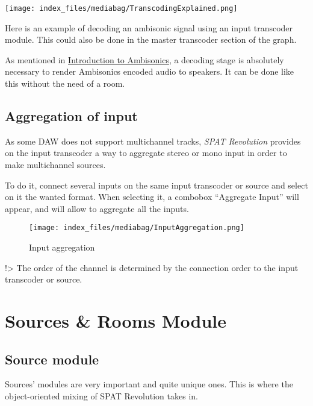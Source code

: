 \documentclass[
  letterpaper,
  DIV=11,
  numbers=noendperiod]{scrreport}
\begin{document}
\texttt{[image: index\_files/mediabag/TranscodingExplained.png]}

Here is an example of decoding an ambisonic signal using an input
transcoder module. This could also be done in the master transcoder
section of the graph.

As mentioned in
\href{Spatialisation_Technology_Scene_based_streams.md?id=introduction-to-ambisonics}{Introduction
to Ambisonics}, a decoding stage is absolutely necessary to render
Ambisonics encoded audio to speakers. It can be done like this without
the need of a room.

\hypertarget{aggregation-of-input}{%
\section{Aggregation of input}\label{aggregation-of-input}}

As some DAW does not support multichannel tracks, \emph{SPAT Revolution}
provides on the input transcoder a way to aggregate stereo or mono input
in order to make multichannel sources.

To do it, connect several inputs on the same input transcoder or source
and select on it the wanted format. When selecting it, a combobox
``Aggregate Input'' will appear, and will allow to aggregate all the
inputs.

\begin{figure}

{\centering \texttt{[image: index\_files/mediabag/InputAggregation.png]}

}

\caption{Input aggregation}

\end{figure}

!\textgreater{} The order of the channel is determined by the connection
order to the input transcoder or source.

\hypertarget{sources-rooms-module}{%
\chapter{Sources \& Rooms Module}\label{sources-rooms-module}}

\hypertarget{source-module}{%
\section{Source module}\label{source-module}}

Sources' modules are very important and quite unique ones. This is where
the object-oriented mixing of SPAT Revolution takes in.
\end{document}
